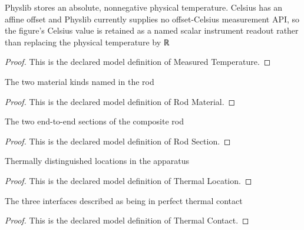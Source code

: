 \begin{definition}
  \label{def:physics:phyx-mini-0331:phyxminiproblems-problemphyxmini0331-measuredtemperature}
  Physlib stores an absolute, nonnegative physical temperature. Celsius has an affine offset and Physlib currently supplies no offset-Celsius measurement API, so the figure's Celsius value is retained as a named scalar instrument readout rather than replacing the physical temperature by ℝ
\end{definition}
\begin{proof}
  This is the declared model definition of Measured Temperature.
\end{proof}
\begin{definition}
  \label{def:physics:phyx-mini-0331:phyxminiproblems-problemphyxmini0331-rodmaterial}
  The two material kinds named in the rod
\end{definition}
\begin{proof}
  This is the declared model definition of Rod Material.
\end{proof}
\begin{definition}
  \label{def:physics:phyx-mini-0331:phyxminiproblems-problemphyxmini0331-rodsection}
  The two end-to-end sections of the composite rod
\end{definition}
\begin{proof}
  This is the declared model definition of Rod Section.
\end{proof}
\begin{definition}
  \label{def:physics:phyx-mini-0331:phyxminiproblems-problemphyxmini0331-thermallocation}
  Thermally distinguished locations in the apparatus
\end{definition}
\begin{proof}
  This is the declared model definition of Thermal Location.
\end{proof}
\begin{definition}
  \label{def:physics:phyx-mini-0331:phyxminiproblems-problemphyxmini0331-thermalcontact}
  The three interfaces described as being in perfect thermal contact
\end{definition}
\begin{proof}
  This is the declared model definition of Thermal Contact.
\end{proof}
